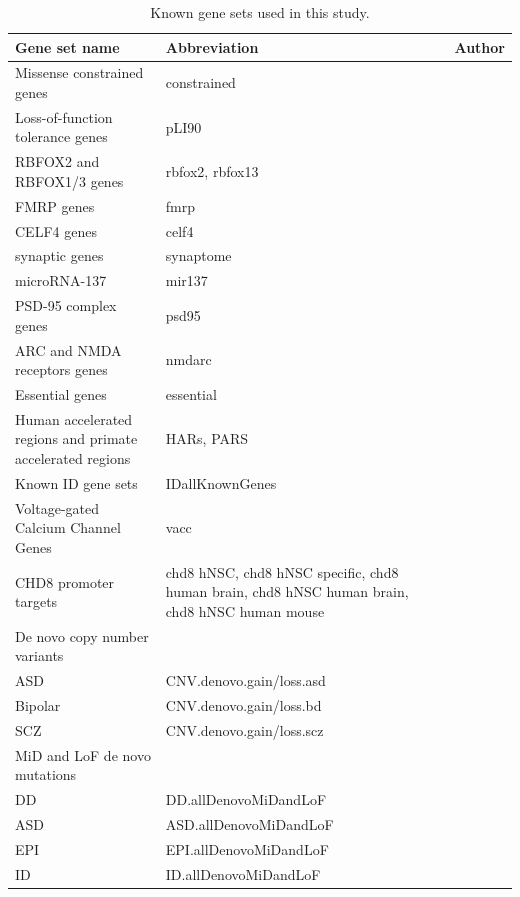 \documentclass[]{article}
\begin{document}
\begin{table}[H]
\begin{tabular}{p{6cm}p{4cm}p{4cm}}

\hline
Gene set name & Abbreviation & Author \\
\hline
Missense constrained genes & constrained &
\cite{samocha2014framework} \\
Loss-of-function tolerance genes & pLI90 & \cite{lek2015analysis} \\

RBFOX2 and RBFOX1/3 genes & rbfox2, rbfox13 &  \cite{weyn2014hits} \\
FMRP genes & fmrp &  \cite{darnell2011fmrp} \\
CELF4 genes & celf4 &  \cite{wagnon2012celf4} \\
synaptic genes & synaptome & \cite{pirooznia2012synaptomedb} \\
microRNA-137 & mir137 &  \cite{robinson2015genetic} \\
PSD-95 complex genes & psd95 &  \cite{bayes2011characterization} \\
ARC and NMDA   receptors  genes & nmdarc & \cite{kirov2012novo} \\
Essential genes & essential & \cite{ji2016increased} \\
Human accelerated regions and primate accelerated regions & HARs, PARS &  \cite{lindblad2011high} \\
 Known ID gene sets & IDallKnownGenes &   \cite{lelieveld2016meta} \\
Voltage-gated Calcium Channel Genes & vacc &  \\
CHD8 promoter targets & chd8 hNSC, chd8 hNSC specific, chd8 human brain,
               chd8 hNSC human brain, chd8 hNSC human mouse &  \cite{cotney2015autism} \\
\hline
 De novo copy number variants & & \cite{genovese2016increased} \\
ASD &  CNV.denovo.gain/loss.asd & \\
Bipolar & CNV.denovo.gain/loss.bd & \\
SCZ &  CNV.denovo.gain/loss.scz & \\
\hline

MiD and LoF de novo mutations & & \\
DD & DD.allDenovoMiDandLoF & \\
ASD & ASD.allDenovoMiDandLoF & \\
EPI & EPI.allDenovoMiDandLoF & \\
ID & ID.allDenovoMiDandLoF& \\
\hline


\end{tabular}
\caption{Known gene sets used in this study.}
\label{tab:knowngenesetAndAbbreviation}
\end{table}
\end{document}
